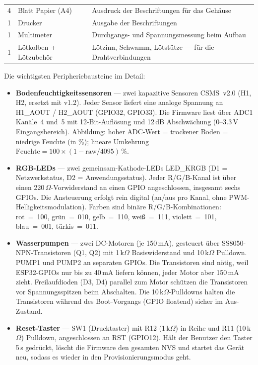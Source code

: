 \documentclass[a4paper,12pt]{article}
\begin{document}
\begin{center}
\begin{tabularx}{\textwidth}{rXX}
4 & Blatt Papier (A4)                              & Ausdruck der Beschriftungen für das Gehäuse \\
1 & Drucker                                        & Ausgabe der Beschriftungen \\
1 & Multimeter                                     & Durchgangs- und Spannungsmessung beim Aufbau \\
1 & Lötkolben + Lötzubehör                         & Lötzinn, Schwamm, Lötstütze --- für die Drahtverbindungen \\
\hline
\end{tabularx}
\end{center}

\noindent Die wichtigsten Peripheriebausteine im Detail:

\begin{itemize}
  \item \textbf{Bodenfeuchtigkeitssensoren} --- zwei kapazitive Sensoren
        CSMS~v2.0 (H1, H2, ersetzt mit v1.2). Jeder Sensor liefert eine analoge Spannung an
        H1\_AOUT / H2\_AOUT (GPIO32, GPIO33). Die Firmware liest über
        ADC1 Kanäle~4 und~5 mit 12-Bit-Auflösung und 12\,dB
        Abschwächung ($0$--$3.3$\,V Eingangsbereich). Abbildung:
        hoher ADC-Wert = trockener Boden = niedrige Feuchte (in \%);
        lineare Umkehrung
        $\text{Feuchte} = 100 \times (1 - \text{raw}/4095)$\,\%.
  \item \textbf{RGB-LEDs} --- zwei gemeinsam-Kathode-LEDs LED\_KRGB
        (D1 = Netzwerkstatus, D2 = Anwendungsstatus). Jeder R/G/B-Kanal
        ist über einen 220\,$\Omega$-Vorwiderstand an einen GPIO
        angeschlossen, insgesamt sechs GPIOs. Die Ansteuerung erfolgt
        rein digital (an/aus pro Kanal, ohne PWM-Helligkeitsmodulation).
        Farben sind binäre R/G/B-Kombinationen:
        rot~=~100, grün~=~010, gelb~=~110, weiß~=~111,
        violett~=~101, blau~=~001, türkis~=~011.
  \item \textbf{Wasserpumpen} --- zwei DC-Motoren (je 150\,mA), gesteuert
        über SS8050-NPN-Transistoren (Q1, Q2) mit 1\,k$\Omega$
        Basiswiderstand und 10\,k$\Omega$ Pulldown. PUMP1 und PUMP2 an
        separaten GPIOs. Die Transistoren sind nötig, weil ESP32-GPIOs
        nur bis zu 40\,mA liefern können, jeder Motor aber 150\,mA zieht.
        Freilaufdioden (D3, D4) parallel zum Motor schützen die
        Transistoren vor Spannungsspitzen beim Abschalten. Die
        10\,k$\Omega$-Pulldowns halten die Transistoren während des
        Boot-Vorgangs (GPIO floatend) sicher im Aus-Zustand.
  \item \textbf{Reset-Taster} --- SW1 (Drucktaster) mit R12
        (1\,k$\Omega$) in Reihe und R11 (10\,k$\Omega$) Pulldown,
        angeschlossen an RST (GPIO12). Hält der Benutzer den Taster
        5\,s gedrückt, löscht die Firmware den gesamten NVS und startet
        das Gerät neu, sodass es wieder in den Provisionierungsmodus
        geht.
\end{itemize}
\end{document}
